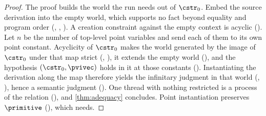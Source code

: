 \begin{proof}
  The proof builds the world the run needs out of $\cstr_0$. Embed the
  source derivation into the empty world, which supports no fact beyond
  equality and program order (, ,
  ). A creation constraint against the empty context
  is acyclic (). Let $n$ be the
  number of top-level point variables and send each of them to its own
  point constant. Acyclicity of $\cstr_0$ makes the world generated by
  the image of $\cstr_0$ under that map strict (,
  ), it extends the empty world (), and
  the hypothesis $(\cstr_0, \pvivec)$ holds in it at those constants
  (). Instantiating the derivation along the map
  therefore yields the infinitary judgment in that world
  (, ), hence a semantic judgment
  (). One thread with nothing restricted is
  a process of the relation (), and
  \cref{thm:adequacy} concludes. Point instantiation preserves
  $\primitive$ (), which  needs.
\end{proof}

